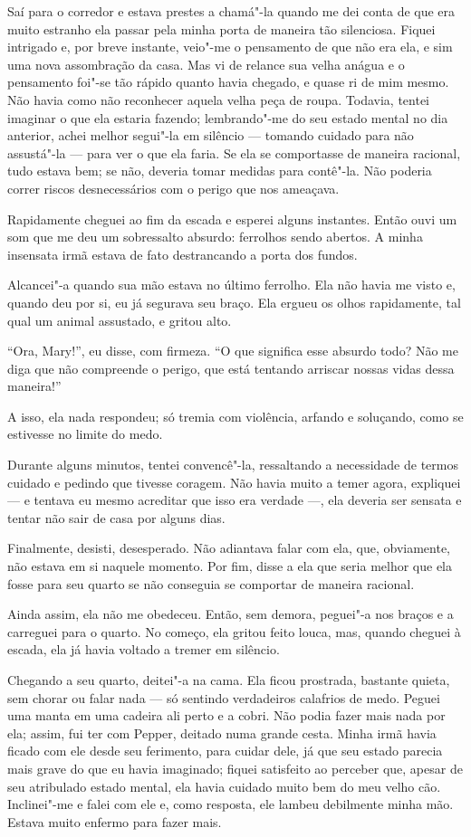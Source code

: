 Saí para o corredor e estava prestes a chamá"-la quando me dei conta de que era muito estranho ela passar
pela minha porta de maneira tão silenciosa. Fiquei intrigado e, por breve instante, veio"-me o pensamento de que
não era ela, e sim uma nova assombração da casa. Mas vi de relance sua velha anágua e o pensamento foi"-se tão rápido
quanto havia chegado, e quase ri de mim mesmo. Não havia como não reconhecer aquela velha peça de roupa. Todavia,
tentei imaginar o que ela estaria fazendo; lembrando"-me do seu estado mental no dia anterior, achei melhor segui"-la em
silêncio --- tomando cuidado para não assustá"-la --- para ver o que ela faria. Se ela se comportasse de maneira racional,
tudo estava bem; se não, deveria tomar medidas para contê"-la. Não poderia correr riscos desnecessários com o perigo que
nos ameaçava.

Rapidamente cheguei ao fim da escada e esperei alguns instantes. Então ouvi um som que me deu um sobressalto
absurdo: ferrolhos sendo abertos. A minha insensata irmã estava de fato destrancando a porta dos fundos.

Alcancei"-a quando sua mão estava no último ferrolho. Ela não havia me visto e, quando deu por si, eu já segurava seu
braço. Ela ergueu os olhos rapidamente, tal qual um animal assustado, e gritou alto.

``Ora, Mary!'', eu disse, com firmeza. “O que significa esse absurdo todo? Não me diga que não compreende o perigo, que
está tentando arriscar nossas vidas dessa maneira!”

A isso, ela nada respondeu; só tremia com violência, arfando e soluçando, como se estivesse no limite do medo.

Durante alguns minutos, tentei convencê"-la, ressaltando a necessidade de termos cuidado e pedindo que tivesse coragem.
Não havia muito a temer agora, expliquei --- e tentava eu mesmo acreditar que isso era verdade ---, ela deveria ser
sensata e tentar não sair de casa por alguns dias.

Finalmente, desisti, desesperado. Não adiantava falar com ela, que, obviamente, não estava em si naquele momento. Por
fim, disse a ela que seria melhor que ela fosse para seu quarto se não conseguia se comportar de maneira racional.

Ainda assim, ela não me obedeceu. Então, sem demora, peguei"-a nos braços e a carreguei para o quarto. No começo, ela
gritou feito louca, mas, quando cheguei à escada, ela já havia voltado a tremer em silêncio.

Chegando a seu quarto, deitei"-a na cama. Ela ficou prostrada, bastante quieta, sem chorar ou falar nada --- só sentindo
verdadeiros calafrios de medo. Peguei uma manta em uma cadeira ali perto e a cobri. Não podia fazer mais nada por ela;
assim, fui ter com Pepper, deitado numa grande cesta. Minha irmã havia ficado com ele desde seu ferimento, para cuidar
dele, já que seu estado parecia mais grave do que eu havia imaginado; fiquei satisfeito ao perceber que, apesar de
seu atribulado estado mental, ela havia cuidado muito bem do meu velho cão. Inclinei"-me e falei com ele e, como
resposta, ele lambeu debilmente minha mão. Estava muito enfermo para fazer mais.

